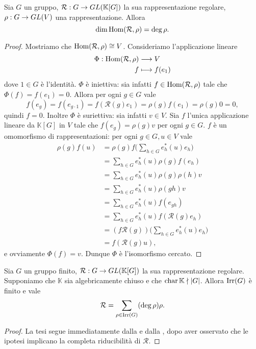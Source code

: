 \begin{proposition}
Sia $G$ un gruppo, $\mathcal{R}:G\to GL(\mathbb{K}[G])$ la sua rappresentazione regolare, $\rho:G\to GL(V)$ una rappresentazione. Allora 
$$
\dim\operatorname{Hom}(\mathcal{R},\rho)=\deg\rho.
$$
\end{proposition}
\begin{proof}
Mostriamo che $\operatorname{Hom}(\mathcal{R},\rho)\cong V$. Consideriamo l'applicazione lineare
\begin{align*}
\Phi:\operatorname{Hom}(\mathcal{R},\rho)&\longrightarrow V\\
f&\longmapsto f(e_1)
\end{align*}
dove $1\in G$ è l'identità. $\Phi$ è iniettiva: sia infatti $f\in\operatorname{Hom}(\mathcal{R},\rho)$ tale che $\Phi(f)=f(e_1)=0$. Allora per ogni $g\in G$ vale
$$
f(e_g)=f(e_{g\cdot1})=f(\mathcal{R}(g)e_1)=\rho(g)f(e_1)=\rho(g)0=0,
$$
quindi $f=0$. Inoltre $\Phi$ è suriettiva: sia infatti $v\in V$. Sia $f$ l'unica applicazione lineare da $\mathbb{K}[G]$ in $V$ tale che $f(e_g)=\rho(g)v$ per ogni $g\in G$. $f$ è un omomorfismo di rappresentazioni: per ogni $g\in G,u\in V$ vale
\begin{align*}
\rho(g)f(u)&=\rho(g)f\biggl(\sum_{h\in G}e_h^*(u)e_h\biggr)\\
&=\sum_{h\in G}e_h^*(u)\rho(g)f(e_h)\\
&=\sum_{h\in G}e_h^*(u)\rho(g)\rho(h)v\\
&=\sum_{h\in G}e_h^*(u)\rho(gh)v\\
&=\sum_{h\in G}e_h^*(u)f(e_{gh})\\
&=\sum_{h\in G}e_h^*(u)f(\mathcal{R}(g)e_h)\\
&=(f\mathcal{R}(g))\biggl(\sum_{h\in G}e_h^*(u)e_h\biggr)\\
&=f(\mathcal{R}(g)u),
\end{align*}
e ovviamente $\Phi(f)=v$. Dunque $\Phi$ è l'isomorfismo cercato.
\end{proof}

\begin{corollary}
Sia $G$ un gruppo finito, $\mathcal{R}:G\to GL(\mathbb{K}[G])$ la sua rappresentazione regolare. Supponiamo che $\mathbb{K}$ sia algebricamente chiuso e che $\operatorname{char}\mathbb{K}\nmid|G|$. Allora $\operatorname{Irr}(G)$ è finito e vale
$$
\mathcal{R}=\sum_{\rho\in\operatorname{Irr}(G)}(\deg\rho)\rho.
$$
\end{corollary}
\begin{proof}
La tesi segue immediatamente dalla  e dalla , dopo aver osservato che le ipotesi implicano la completa riducibilità di $\mathcal{R}$.
\end{proof}

